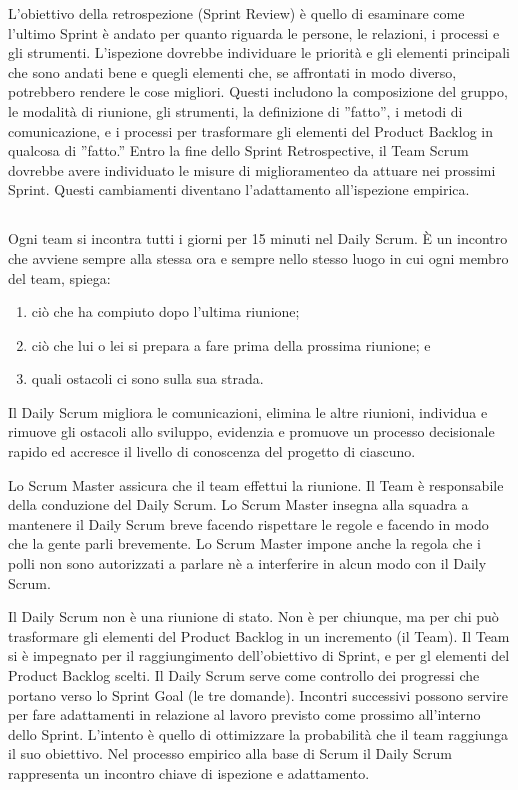 L'obiettivo della retrospezione (Sprint Review) \`e quello di esaminare come l'ultimo Sprint \`e andato per quanto riguarda le persone,
le relazioni, i processi e gli strumenti. L'ispezione dovrebbe individuare le priorit\`a e gli elementi principali che
sono andati bene e quegli elementi che, se affrontati in modo diverso, potrebbero rendere le cose migliori. Questi includono la
composizione del gruppo, le modalit\`a di riunione, gli strumenti, la definizione di ''fatto'', i metodi di
comunicazione, e i processi per trasformare gli elementi del Product Backlog in qualcosa di ''fatto.'' Entro la fine
dello Sprint Retrospective, il Team Scrum dovrebbe avere individuato le misure di miglioramenteo da attuare nei
prossimi Sprint. Questi cambiamenti diventano l'adattamento all'ispezione empirica.


\subsection*{\color{Blue}{DAILY SCRUM}}
\label{sec:dailyscrum}
Ogni team si incontra tutti i giorni per 15 minuti nel Daily Scrum. \`E un incontro che avviene sempre alla stessa ora
e sempre nello stesso luogo in cui ogni membro del team, spiega:
\begin{enumerate}
	\item ci\`o che  ha compiuto dopo l'ultima riunione;
	\item ci\`o che lui o lei si prepara a fare prima della prossima riunione; e
	\item quali ostacoli ci sono sulla sua strada.
\end{enumerate}

Il Daily Scrum migliora le comunicazioni, elimina le altre riunioni, individua e rimuove gli ostacoli allo sviluppo,
evidenzia e promuove un processo decisionale rapido ed accresce il livello di conoscenza del progetto di ciascuno.
\newline

Lo Scrum Master assicura che il team effettui la riunione. Il Team \`e responsabile della conduzione del Daily Scrum. Lo
Scrum Master insegna alla squadra a mantenere il Daily Scrum breve facendo rispettare le regole e facendo in modo che
la gente parli brevemente. Lo Scrum Master impone anche la regola che i polli non sono autorizzati a parlare n\`e a interferire in alcun
modo con il Daily Scrum.
 \newline

Il Daily Scrum non \`e una riunione di stato. Non \`e per chiunque, ma per chi pu\`o trasformare gli elementi del
Product Backlog in un incremento (il Team). Il Team si \`e impegnato per il raggiungimento dell'obiettivo di Sprint,  e per
gl elementi del Product Backlog scelti. Il Daily Scrum serve come controllo dei progressi che portano verso lo Sprint Goal (le
tre domande). 
Incontri successivi possono servire per fare adattamenti in relazione al lavoro previsto come prossimo all'interno dello Sprint.
L'intento \`e quello di ottimizzare la probabilit\`a che il team raggiunga il suo obiettivo. Nel processo
empirico alla base di Scrum il Daily Scrum rappresenta un incontro chiave di ispezione e adattamento.


